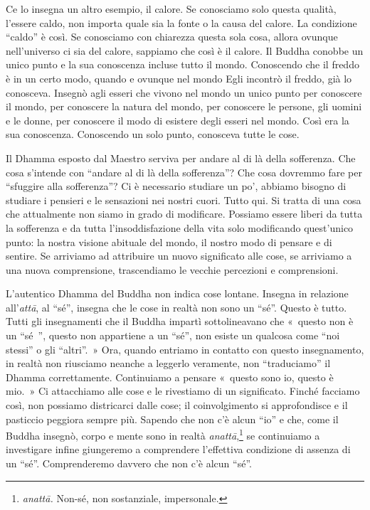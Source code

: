 Ce lo insegna un altro esempio, il calore. Se conosciamo solo questa
qualità, l'essere caldo, non importa quale sia la fonte o la causa del
calore. La condizione ``caldo'' è così. Se conosciamo con chiarezza
questa sola cosa, allora ovunque nell'universo ci sia del calore,
sappiamo che così è il calore. Il Buddha conobbe un unico punto e la sua
conoscenza incluse tutto il mondo. Conoscendo che il freddo è in un
certo modo, quando e ovunque nel mondo Egli incontrò il freddo, già lo
conosceva. Insegnò agli esseri che vivono nel mondo un unico punto per
conoscere il mondo, per conoscere la natura del mondo, per conoscere le
persone, gli uomini e le donne, per conoscere il modo di esistere degli
esseri nel mondo. Così era la sua conoscenza. Conoscendo un solo punto,
conosceva tutte le cose.

Il Dhamma esposto dal Maestro serviva per andare al di là della
sofferenza. Che cosa s'intende con ``andare al di là della sofferenza''?
Che cosa dovremmo fare per ``sfuggire alla sofferenza''? Ci è necessario
studiare un po', abbiamo bisogno di studiare i pensieri e le sensazioni
nei nostri cuori. Tutto qui. Si tratta di una cosa che attualmente non
siamo in grado di modificare. Possiamo essere liberi da tutta la
sofferenza e da tutta l'insoddisfazione della vita solo modificando
quest'unico punto: la nostra visione abituale del mondo, il nostro modo
di pensare e di sentire. Se arriviamo ad attribuire un nuovo significato
alle cose, se arriviamo a una nuova comprensione, trascendiamo le
vecchie percezioni e comprensioni.

L'autentico Dhamma del Buddha non indica cose lontane. Insegna in
relazione all'\emph{attā}, al ``sé'', insegna che le cose in realtà non
sono un ``sé''. Questo è tutto. Tutti gli insegnamenti che il Buddha
impartì sottolineavano che «~questo non è un ``sé~'', questo non
appartiene a un ``sé'', non esiste un qualcosa come ``noi stessi'' o gli
``altri''.~» Ora, quando entriamo in contatto con questo insegnamento,
in realtà non riusciamo neanche a leggerlo veramente, non ``traduciamo''
il Dhamma correttamente. Continuiamo a pensare «~questo sono io, questo
è mio.~» Ci attacchiamo alle cose e le rivestiamo di un significato.
Finché facciamo così, non possiamo districarci dalle cose; il
coinvolgimento si approfondisce e il pasticcio peggiora sempre più.
Sapendo che non c'è alcun ``io'' e che, come il Buddha insegnò, corpo e
mente sono in realtà \emph{anattā},\footnote{\emph{anattā.} Non-sé, non
  sostanziale, impersonale.} se continuiamo a investigare infine
giungeremo a comprendere l'effettiva condizione di assenza di un ``sé''.
Comprenderemo davvero che non c'è alcun ``sé''.

